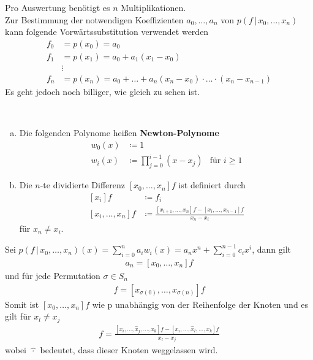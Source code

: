 Pro Auswertung benötigt es $n$ Multiplikationen.\\
Zur Bestimmung der notwendigen Koeffizienten $a_0, \dots, a_n$
von $p(f\,|\, x_0, \dots , x_n)$ kann folgende 
Vorwärtssubstitution verwendet werden
\begin{align*}
  f_0 &= p(x_0) = a_0\\
  f_1 &= p(x_1) = a_0+a_1(x_1-x_0)\\
      &\vdots\\
  f_n &=p(x_n) = a_0 + \dots + a_n(x_n-x_0)\cdot\dots\cdot(x_n-x_{n-1})
\end{align*}
Es geht jedoch noch billiger, wie gleich zu sehen ist.

\begin{Defe}~
  \begin{enumerate}[a)]
  \item Die folgenden Polynome heißen \textbf{Newton-Polynome}
    \begin{align*}
      w_0(x) &\coloneqq 1\\
      w_i(x) &\coloneqq \prod_{j=0}^{i-1} (x-x_j)
             &\text{für } i\geq 1
    \end{align*}
  \item Die $n$-te dividierte Differenz $[x_0,\dots , x_n]f$
    ist definiert durch
    \begin{align}\nonumber
      [x_i]f &\coloneqq f_i\\
      [x_i,\dots, x_n]f 
             &\coloneqq
               \frac{[x_{i+1},\dots,x_n]f-[x_i,\dots,x_{n-1}]f}
               {x_n-x_i}
               \label{VI.1.11}
    \end{align}
    für $x_n\neq x_i$.
  \end{enumerate}
\end{Defe}


\begin{Satze}\label{6.1.6}
  Sei $p(f\,|\, x_0,\dots ,x_n)(x)=\sum_{i=0}^{n}a_iw_i(x) = 
  a_nx^n+ \sum_{i=0}^{n-1}c_ix^i$, dann gilt
  \begin{gather*}
    a_n= [x_0, \dots, x_n]f
  \end{gather*}
  und für jede Permutation $\sigma \in S_n$
  \begin{gather*}
    [x_0,\dots, x_n]f= [x_{\sigma(0)},\dots , x_{\sigma(n)}]f
  \end{gather*}
  Somit ist $[x_0, \dots, x_n]f$ wie p unabhängig von der
  Reihenfolge der Knoten und es gilt für $x_l\neq x_j$
  \begin{gather}
    [x_i, \dots, x_k] f= \frac{[x_i,\dots,\widehat{x}_j,\dots,x_k]f
      -[x_i,\dots,\widehat{x}_l,\dots,x_k]f}
    {x_l-x_j}
    \label{VI.1.12}
  \end{gather}
  wobei $\widehat{\,\cdot\,}$ bedeutet, dass dieser Knoten
  weggelassen wird.
\end{Satze}

